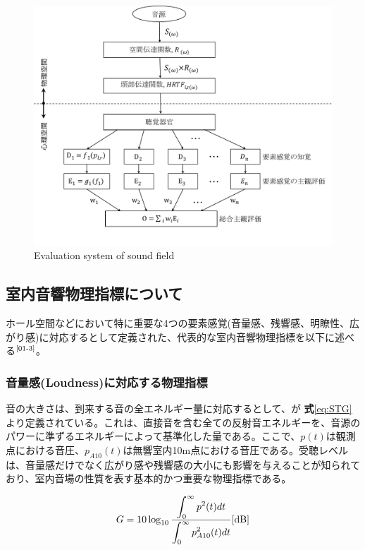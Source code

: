 \begin{figure}[htbp]
    \centering
    \includegraphics[keepaspectratio,scale=0.5]{01_att/phyco.pdf}
    \caption{\hspace{1mm}Evaluation system of sound field}
    \label{fig:室内音響心理評価システム}
\end{figure}

\subsection{室内音響物理指標について}
ホール空間などにおいて特に重要な4つの要素感覚(音量感、残響感、明瞭性、広がり感)に対応するとして定義された、代表的な室内音響物理指標を以下に述べる$^{\text{\cite{01-3}}}$。

\subsubsection{音量感(Loudness)に対応する物理指標}
音の大きさは、到来する音の全エネルギー量に対応するとして、\STG が \textbf{式}\ref{eq:STG}より定義されている。これは、直接音を含む全ての反射音エネルギーを、音源のパワーに準ずるエネルギーによって基準化した量である。ここで、$p(t)$は観測点における音圧、$p_{A10}(t)$は無響室内10m点における音圧である。受聴レベルは、音量感だけでなく広がり感や残響感の大小にも影響を与えることが知られており、室内音場の性質を表す基本的かつ重要な物理指標である。

\begin{equation}
  \label{eq:STG}
  G = 10\log_{10}{\frac{\displaystyle\int_0^{\infty}p^2(t)dt}{\displaystyle\int_0^{\infty}p_{A10}^2(t)dt}} \textrm{[dB]}
\end{equation}

